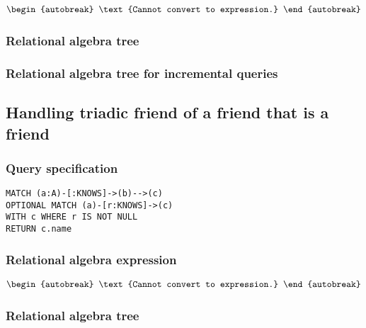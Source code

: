 \begin{align*}
\begin{autobreak}
\text{Cannot convert to expression.}
\end{autobreak}
\end{align*}

\subsubsection*{Relational algebra tree}


\subsubsection*{Relational algebra tree for incremental queries}


\subsection{Handling triadic friend of a friend that is a friend}

\subsubsection*{Query specification}

\begin{lstlisting}
MATCH (a:A)-[:KNOWS]->(b)-->(c)
OPTIONAL MATCH (a)-[r:KNOWS]->(c)
WITH c WHERE r IS NOT NULL
RETURN c.name
\end{lstlisting}

\subsubsection*{Relational algebra expression}

\begin{align*}
\begin{autobreak}
\text{Cannot convert to expression.}
\end{autobreak}
\end{align*}

\subsubsection*{Relational algebra tree}


